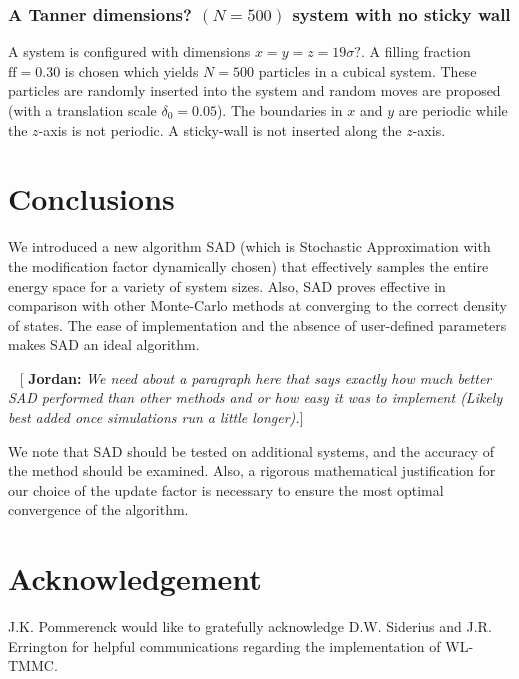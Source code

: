 \documentclass[letterpaper,twocolumn,amsmath,amssymb,pre,aps,10pt]{revtex4-1}
\newcommand{\blue}[1]{{\bf \color{blue} #1}}
\newcommand{\jpsays}[1]{{\color{red} [\blue{Jordan:} \emph{#1}]}}
\begin{document}
\subsubsection{A Tanner dimensions? $(N = 500)$ system with no sticky
wall}

A system is configured with dimensions $x = y = z = 19\sigma?$.  A
filling fraction $\text{ff} = 0.30$ is chosen which yields $N = 500$
particles in a cubical system.  These particles are randomly inserted
into the system and random moves are proposed (with a translation scale
$\delta_0 = 0.05$). The boundaries in $x$ and $y$ are periodic while
the $z$-axis is not periodic.  A sticky-wall is not inserted along the
$z$-axis.

\section{Conclusions}

We introduced a new algorithm SAD (which is Stochastic Approximation
with the modification factor dynamically chosen) that effectively
samples the entire energy space for a variety of system sizes.  Also,
SAD proves effective in comparison with other Monte-Carlo methods at
converging to the correct density of states.  The ease of
implementation and the absence of user-defined parameters makes SAD an
ideal algorithm.

~\jpsays{We need about a paragraph here that says exactly how much
better SAD performed than other methods and or how easy it was to
implement (Likely best added once simulations run a little longer).}

We note that SAD should be tested on additional systems, and the
accuracy of the method should be examined.  Also, a rigorous
mathematical justification for our choice of the update factor is
necessary to ensure the most optimal convergence of the algorithm.

\section{Acknowledgement}

J.K. Pommerenck would like to gratefully acknowledge D.W. Siderius and
J.R. Errington for helpful communications regarding the implementation
of WL-TMMC.


\end{document}

